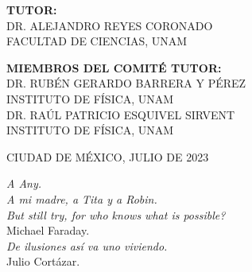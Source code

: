 \documentclass[11pt,twoside]{book}
\begin{document}
\begin{toexclude}
\begin{titlepage}
\begin{center}
\begin{spacing}{1.2}
			\textbf{\large TUTOR:}\\[0.2cm]
			{\large DR. ALEJANDRO REYES CORONADO}\\
			{\small FACULTAD DE CIENCIAS, UNAM}\\[0.5cm]
			\vspace*{\fill}
			
			\textbf{\large MIEMBROS DEL COMIT\'E TUTOR:}\\[0.2cm]
			{\large DR. RUB\'EN GERARDO BARRERA Y P\'EREZ}\\
			{\small INSTITUTO DE F\'ISICA, UNAM}\\
			{\large DR. RA\'UL PATRICIO ESQUIVEL SIRVENT}\\
			{\small INSTITUTO DE F\'ISICA, UNAM}\\[0.5cm]
		\end{spacing}
		
		{\large CIUDAD DE M\'EXICO, JULIO DE 2023}
		
	
	\end{center}
\end{titlepage}
%
%
%
%
\begin{flushright}
\null{}
\Large{\textit{A Any.}}\\
\Large{\textit{A mi madre, a Tita y a Robin.}}\\
\vspace{3cm}
\large {\guillemotleft\textit{But still try, for who knows what is possible?}\guillemotright }\\
\normalsize{Michael Faraday.}\\
\vspace{1cm}
\large {\guillemotleft\textit{De ilusiones así va uno viviendo.}\guillemotright }\\
\normalsize{Julio Cortázar.}
\null
\end{flushright}

%
%
%
{
	\hypersetup{linkcolor=black}
	\tableofcontents             %
}
\setlength{\parskip}{1mm}


\end{toexclude}
\end{document}
